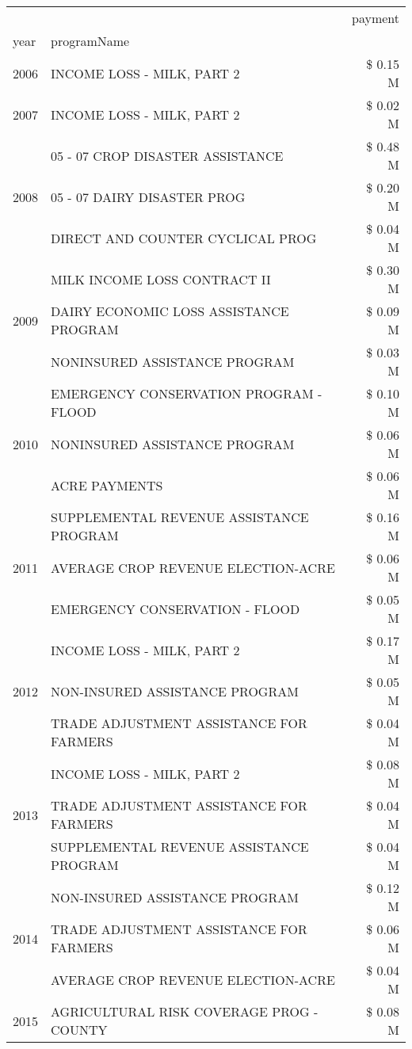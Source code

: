 \begin{tabular}{llr}
\toprule
 &  & payment \\
year & programName &  \\
\midrule
2006 & INCOME LOSS - MILK, PART 2 & \$ 0.15 M \\
\cline{1-3}
2007 & INCOME LOSS - MILK, PART 2 & \$ 0.02 M \\
\cline{1-3}
\multirow[t]{3}{*}{2008} & 05 - 07 CROP DISASTER ASSISTANCE & \$ 0.48 M \\
 & 05 - 07 DAIRY DISASTER PROG & \$ 0.20 M \\
 & DIRECT AND COUNTER CYCLICAL PROG & \$ 0.04 M \\
\cline{1-3}
\multirow[t]{3}{*}{2009} & MILK INCOME LOSS CONTRACT II & \$ 0.30 M \\
 & DAIRY ECONOMIC LOSS ASSISTANCE PROGRAM & \$ 0.09 M \\
 & NONINSURED ASSISTANCE PROGRAM & \$ 0.03 M \\
\cline{1-3}
\multirow[t]{3}{*}{2010} & EMERGENCY CONSERVATION PROGRAM - FLOOD & \$ 0.10 M \\
 & NONINSURED ASSISTANCE PROGRAM & \$ 0.06 M \\
 & ACRE PAYMENTS & \$ 0.06 M \\
\cline{1-3}
\multirow[t]{3}{*}{2011} & SUPPLEMENTAL REVENUE ASSISTANCE PROGRAM & \$ 0.16 M \\
 & AVERAGE CROP REVENUE ELECTION-ACRE & \$ 0.06 M \\
 & EMERGENCY CONSERVATION - FLOOD & \$ 0.05 M \\
\cline{1-3}
\multirow[t]{3}{*}{2012} & INCOME LOSS - MILK, PART 2 & \$ 0.17 M \\
 & NON-INSURED ASSISTANCE PROGRAM & \$ 0.05 M \\
 & TRADE ADJUSTMENT ASSISTANCE FOR FARMERS & \$ 0.04 M \\
\cline{1-3}
\multirow[t]{3}{*}{2013} & INCOME LOSS - MILK, PART 2 & \$ 0.08 M \\
 & TRADE ADJUSTMENT ASSISTANCE FOR FARMERS & \$ 0.04 M \\
 & SUPPLEMENTAL REVENUE ASSISTANCE PROGRAM & \$ 0.04 M \\
\cline{1-3}
\multirow[t]{3}{*}{2014} & NON-INSURED ASSISTANCE PROGRAM & \$ 0.12 M \\
 & TRADE ADJUSTMENT ASSISTANCE FOR FARMERS & \$ 0.06 M \\
 & AVERAGE CROP REVENUE ELECTION-ACRE & \$ 0.04 M \\
\cline{1-3}
\multirow[t]{3}{*}{2015} & AGRICULTURAL RISK COVERAGE PROG - COUNTY & \$ 0.08 M \\

\end{tabular}
